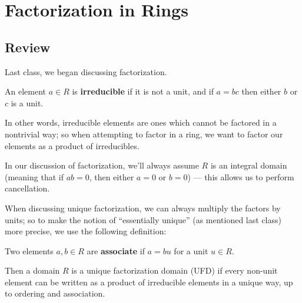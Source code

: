 

\section{Factorization in Rings}

\subsection{Review}

Last class, we began discussing factorization. 

\begin{definition}
 An element $a \in R$ is \textbf{irreducible} if it is not a unit, and if $a = bc$ then either $b$ or $c$ is a unit.
\end{definition}

In other words, irreducible elements are ones which cannot be factored in a nontrivial way; so when attempting to factor in a ring, we want to factor our elements as a product of irreducibles. 

In our discussion of factorization, we'll always assume $R$ is an integral domain (meaning that if $ab = 0$, then either $a = 0$ or $b = 0$) --- this allows us to perform cancellation. 

When discussing unique factorization, we can always multiply the factors by units; so to make the notion of ``essentially unique'' (as mentioned last class) more precise, we use the following definition:

\begin{definition}
 Two elements $a, b \in R$ are \textbf{associate} if $a = bu$ for a unit $u \in R$. 
\end{definition}

Then a domain $R$ is a unique factorization domain (UFD) if every non-unit element can be written as a product of irreducible elements in a unique way, up to ordering and association. 


